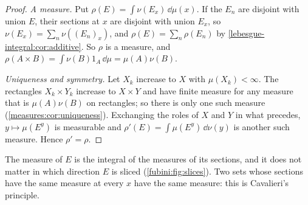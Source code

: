 \begin{notechapter}
\begin{proof}
\emph{A measure.} Put $\rho(E) = \int\nu(E_x)\,\dd\mu(x)$. If the $E_n$
are disjoint with union $E$, their sections at $x$ are disjoint with
union $E_x$, so $\nu(E_x) = \sum_n\nu((E_n)_x)$, and
$\rho(E) = \sum_n\rho(E_n)$ by \cref{lebesgue-integral:cor:additive}.
So $\rho$ is a measure, and
$\rho(A\times B) = \int\nu(B)1_A\,\dd\mu = \mu(A)\nu(B)$.

\emph{Uniqueness and symmetry.} Let $X_k$ increase to $X$ with
$\mu(X_k) < \infty$. The rectangles $X_k\times Y_k$ increase to
$X\times Y$ and have finite measure for any measure that is
$\mu(A)\nu(B)$ on rectangles; so there is only one such measure
(\cref{measures:cor:uniqueness}). Exchanging the roles of $X$ and $Y$
in what precedes, $y\mapsto\mu(E^y)$ is measurable and
$\rho'(E) = \int\mu(E^y)\,\dd\nu(y)$ is another such measure. Hence
$\rho' = \rho$.
\end{proof}

\begin{keyidea}
The measure of $E$ is the integral of the measures of its sections, and
it does not matter in which direction $E$ is sliced
(\cref{fubini:fig:slices}). Two sets whose sections have the same
measure at every $x$ have the same measure: this is Cavalieri's
principle.
\end{keyidea}


\end{notechapter}
